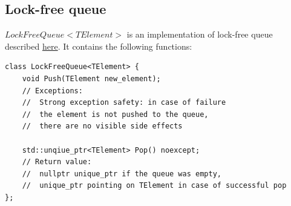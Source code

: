\documentclass{article}
\begin{document}
\subsection{Lock-free queue}

$LockFreeQueue<TElement>$ is an implementation of lock-free queue described \hyperref[subsec:dealloc_lock_free_queue]{here}. It contains the following functions:

\begin{lstlisting}
class LockFreeQueue<TElement> {
	void Push(TElement new_element);
	// Exceptions:
	// 	Strong exception safety: in case of failure
	// 	the element is not pushed to the queue,
	// 	there are no visible side effects

	std::unqiue_ptr<TElement> Pop() noexcept;
	// Return value:
	// 	nullptr unique_ptr if the queue was empty,
	// 	unique_ptr pointing on TElement in case of successful pop
};
\end{lstlisting}
\end{document}
